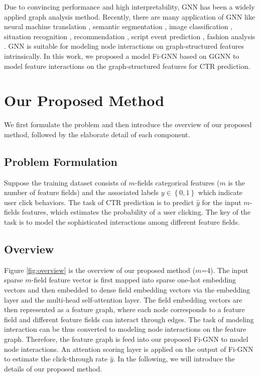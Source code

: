 \documentclass[sigconf]{acmart}
\begin{document}
Due to convincing performance and high interpretability, GNN has been a widely applied graph analysis method.
Recently, there are many application of GNN like neural machine translation \cite{beck2018graph}, semantic segmentation \cite{qi20173d}, image classification \cite{marino2017more}, situation recognition \cite{li2017situation}, recommendation \cite{Wu2018Session}, script event prediction \cite{Zhongyang2018Constructing}, fashion analysis \cite{cui2019dressing,li2019semi}.
GNN is suitable for modeling node interactions on graph-structured features intrinsically.
In this work, we proposed a model Fi-GNN based on GGNN to model feature interactions on the graph-structured features for CTR prediction. 

\section{Our Proposed Method}
We first formulate the problem and then introduce the overview of our proposed method, followed by the elaborate detail of each component.
 
\subsection{Problem Formulation}
Suppose the training dataset consists of $m$-fields categorical features ($m$ is the number of feature fields) and the associated labels $y \in \left \{ 0,1 \right \}$ which indicate user click behaviors.
The task of CTR prediction is to predict $\hat{y}$ for the input $m$-fields features, which estimates the probability of a user clicking.
The key of the task is to model the sophisticated interactions among different feature fields.

\subsection{Overview}
Figure \ref{fig:overview} is the overview of our proposed method ($m$=4).   
The input sparse $m$-field feature vector is first mapped into sparse one-hot embedding vectors and then embedded to dense field embedding vectors via the embedding layer and the multi-head self-attention layer. 
The field embedding vectors are then represented as a feature graph, where each node corresponds to a feature field and different feature fields can interact through edges.
The task of modeling interaction can be thus converted to modeling node interactions on the feature graph.
Therefore, the feature graph is feed into our proposed Fi-GNN to model node interactions.  
An attention scoring layer is applied on the output of Fi-GNN to estimate the click-through rate $\hat{y}$. 
In the following, we will introduce the details of our proposed method.
    
\end{document}
